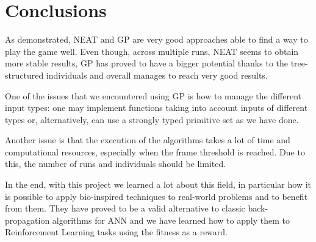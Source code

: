 \section{Conclusions}
As demonstrated, NEAT and GP are very good approaches able to find a way to play the game well. Even
though, across multiple runs, NEAT seems to obtain more stable results, GP has
proved to have a bigger potential thanks to the tree-structured individuals and overall
manages to reach very good results.

One of the issues that we encountered using GP is how to manage the different input types:
one may implement functions taking into account inputs of different types or, alternatively,
can use a strongly typed primitive set as we have done.

Another issue is that the execution of the algorithms takes a lot of time and
computational resources, especially when the frame threshold is reached. Due to this, the
number of runs and individuals should be limited.

In the end, with this project we learned a lot about this field, in particular how it is possible to
apply bio-inspired techniques to real-world problems and to benefit from them. They have
proved to be a valid alternative to classic back-propagation algorithms for ANN and we have learned how to
apply them to Reinforcement Learning tasks using the fitness as a reward.
